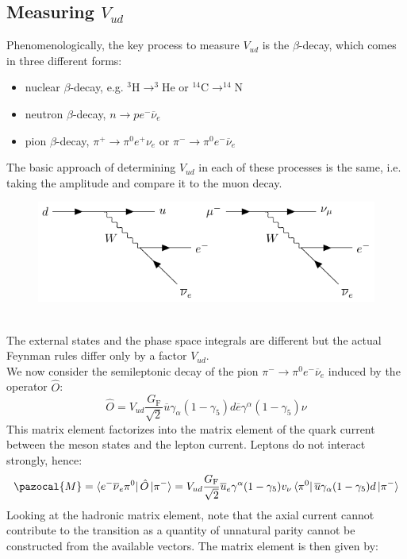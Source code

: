 \documentclass[../main.tex]{subfiles}
\begin{document}
\subsection{Measuring $V_{ud}$}
Phenomenologically, the key process to measure $V_{ud}$ is the $\beta$-decay, which comes in three different forms:
\begin{itemize}
    \item nuclear $\beta$-decay, e.g. $^3$H$\to^3$He or $^{14}$C$\to^{14}$N
    \item neutron $\beta$-decay, $n\to pe^-\overline{\nu}_e$
    \item pion $\beta$-decay, $\pi^+\to\pi^0e^+\nu_e$ or $\pi^-\to\pi^0e^-\overline{\nu}_e$
\end{itemize}
The basic approach of determining $V_{ud}$ in each of these processes is the same, i.e. taking the amplitude and compare it to the muon decay.
\begin{figure}[h]
    \centering
    \includegraphics{Images/Vud.pdf}
    \caption*{}
\end{figure}\\
The external states and the phase space integrals are different but the actual Feynman rules differ only by a factor $V_{ud}$.\\
We now consider the semileptonic decay of the pion $\pi^-\to\pi^0e^-\overline{\nu}_e$ induced by the operator $\hat{O}$:
\[
\hat{O}=V_{ud}\frac{G_{\text{F}}}{\sqrt{2}}\overline{u}\gamma_\alpha(1-\gamma_5)d\overline{e}\gamma^\alpha(1-\gamma_5)\nu
\]
This matrix element factorizes into the matrix element of the quark current between the meson states and the lepton current. Leptons do not interact strongly, hence:
\[
\pazocal{M}=\bra{e^-\overline{\nu}_e\pi^0}\hat{O}\ket{\pi^-}=V_{ud}\frac{G_{\text{F}}}{\sqrt{2}}\overline{u}_e\gamma^\alpha(1-\gamma_5)v_\nu\bra{\pi^0}\overline{u}\gamma_\alpha(1-\gamma_5)d\ket{\pi^-}
\]
Looking at the hadronic matrix element, note that the axial current cannot contribute to the transition as a quantity of unnatural parity cannot be constructed from the available vectors. The matrix element is then given by:
\end{document}
